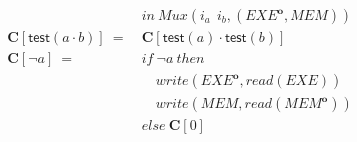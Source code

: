 \documentclass[12pt, letterpaper]{article}
\def \sysname {\textsc{GARUDA 2.0}\xspace}
\def \oldname {\textsc{GARUDA}\xspace}
\newcommand\obf[1]{#1^\mathbf{o}}
\begin{document}
{\begin{align*}
              &in\ Mux(i_a\ \ i_b, (\obf{EXE},MEM))\\
            \mathbf{C}[\mathsf{test}(a \cdot b)]\ 
              =\ &\mathbf{C}[\mathsf{test}(a) \cdot \mathsf{test}(b)] \\
            \mathbf{C}[\neg a]\ 
              =\ 
              &if\ \neg a\ then\\
              &\quad write(\obf{EXE}, read(EXE))\\
              &\quad write(MEM, read(\obf{MEM}))\\
              &else\ \mathbf{C}[0]\\
          \end{align*}}
\end{document}
